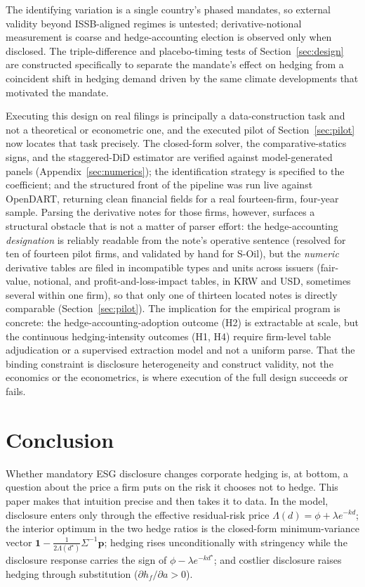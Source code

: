 \documentclass[11pt,a4paper]{article}
\begin{document}
The identifying variation is a single country's phased mandates, so external validity beyond ISSB-aligned regimes is untested; derivative-notional measurement is coarse and hedge-accounting election is observed only when disclosed. The triple-difference and placebo-timing tests of Section~\ref{sec:design} are constructed specifically to separate the mandate's effect on hedging from a coincident shift in hedging demand driven by the same climate developments that motivated the mandate.

Executing this design on real filings is principally a data-construction task and not a theoretical or econometric one, and the executed pilot of Section~\ref{sec:pilot} now locates that task precisely. The closed-form solver, the comparative-statics signs, and the staggered-DiD estimator are verified against model-generated panels (Appendix~\ref{sec:numerics}); the identification strategy is specified to the coefficient; and the structured front of the pipeline was run live against OpenDART, returning clean financial fields for a real fourteen-firm, four-year sample. Parsing the derivative notes for those firms, however, surfaces a structural obstacle that is not a matter of parser effort: the hedge-accounting \emph{designation} is reliably readable from the note's operative sentence (resolved for ten of fourteen pilot firms, and validated by hand for S-Oil), but the \emph{numeric} derivative tables are filed in incompatible types and units across issuers (fair-value, notional, and profit-and-loss-impact tables, in KRW and USD, sometimes several within one firm), so that only one of thirteen located notes is directly comparable (Section~\ref{sec:pilot}). The implication for the empirical program is concrete: the hedge-accounting-adoption outcome (H2) is extractable at scale, but the continuous hedging-intensity outcomes (H1, H4) require firm-level table adjudication or a supervised extraction model and not a uniform parse. That the binding constraint is disclosure heterogeneity and construct validity, not the economics or the econometrics, is where execution of the full design succeeds or fails.

\section{Conclusion}
\label{sec:conclusion}

Whether mandatory ESG disclosure changes corporate hedging is, at bottom, a question about the price a firm puts on the risk it chooses not to hedge. This paper makes that intuition precise and then takes it to data. In the model, disclosure enters only through the effective residual-risk price $\Lambda(d)=\phi+\lambda e^{-kd}$; the interior optimum in the two hedge ratios is the closed-form minimum-variance vector $\mathbf 1-\tfrac{1}{2\Lambda(d^\star)}\Sigma^{-1}\mathbf p$; hedging rises unconditionally with stringency while the disclosure response carries the sign of $\phi-\lambda e^{-kd^\star}$; and costlier disclosure raises hedging through substitution ($\partial h_f/\partial a>0$).
\end{document}
